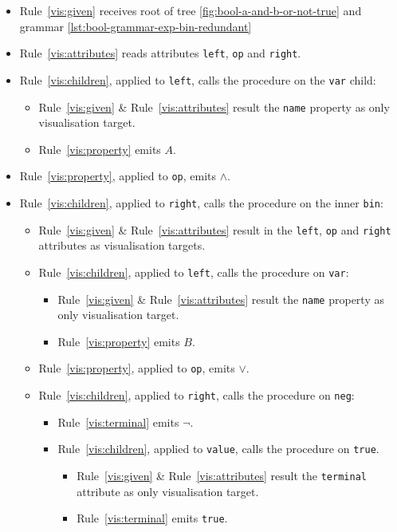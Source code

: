 \documentclass[]{report}
\begin{document}
\begin{itemize}
  \item Rule~\ref{vis:given} receives root of tree \cref{fig:bool-a-and-b-or-not-true} and grammar \cref{lst:bool-grammar-exp-bin-redundant}
  \item Rule~\ref{vis:attributes} reads attributes \texttt{left}, \texttt{op} and \texttt{right}.
  \item Rule~\ref{vis:children}, applied to \texttt{left}, calls the procedure on the \texttt{var} child:
  \begin{itemize}[label=\textbullet]
    \item Rule~\ref{vis:given} \& Rule~\ref{vis:attributes} result the \texttt{name} property as only visualisation target.
    \item Rule~\ref{vis:property} emits $A$.
  \end{itemize}
  \item Rule~\ref{vis:property}, applied to \texttt{op}, emits $\land$.
  \item Rule~\ref{vis:children}, applied to \texttt{right}, calls the procedure on the inner \texttt{bin}:
    \begin{itemize}[label=\textbullet]
      \item Rule~\ref{vis:given} \& Rule~\ref{vis:attributes} result in the \texttt{left}, \texttt{op} and \texttt{right} attributes as visualisation targets.
      \item Rule~\ref{vis:children}, applied to \texttt{left}, calls the procedure on \texttt{var}:
      \begin{itemize}[label=\textbullet]
        \item Rule~\ref{vis:given} \& Rule~\ref{vis:attributes} result the \texttt{name} property as only visualisation target.
        \item Rule~\ref{vis:property} emits $B$.
      \end{itemize}
      \item Rule~\ref{vis:property}, applied to \texttt{op}, emits $\lor$.
      \item Rule~\ref{vis:children}, applied to \texttt{right}, calls the procedure on \texttt{neg}:
        \begin{itemize}[label=\textbullet]
          \item Rule~\ref{vis:terminal} emits $\neg$.
          \item Rule~\ref{vis:children}, applied to \texttt{value}, calls the procedure on \texttt{true}.
          \begin{itemize}[label=\textbullet]
              \item Rule~\ref{vis:given} \& Rule~\ref{vis:attributes} result the \texttt{terminal} attribute as only visualisation target.
            \item Rule~\ref{vis:terminal} emits \texttt{true}.
          \end{itemize}
        \end{itemize}
    \end{itemize}
\end{itemize}
\end{document}
